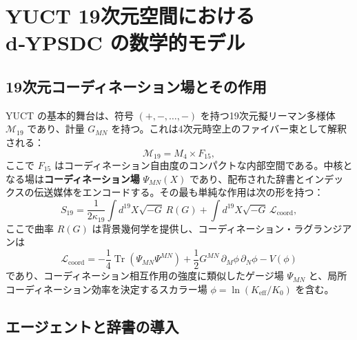 \documentclass[11pt,a4paper]{article}
\DeclareMathOperator{\Tr}{Tr}
\begin{document}
	\section{YUCT 19次元空間における d‑YPSDC の数学的モデル}
	\label{sec:math-model}
	
	\subsection{19次元コーディネーション場とその作用}
	
	YUCT の基本的舞台は、符号 \((+,-,\dots,-)\) を持つ19次元擬リーマン多様体 \(\mathcal{M}_{19}\) であり、計量 \(G_{MN}\) を持つ。これは4次元時空上のファイバー束として解釈される：
	\begin{equation}
		\mathcal{M}_{19} = M_4 \times F_{15},
	\end{equation}
	ここで \(F_{15}\) はコーディネーション自由度のコンパクトな内部空間である。中核となる場は\textbf{コーディネーション場} \(\Psi_{MN}(X)\) であり、配布された辞書とインデックスの伝送媒体をエンコードする。その最も単純な作用は次の形を持つ：
	\begin{equation}
		S_{19} = \frac{1}{2\kappa_{19}} \int d^{19}X \sqrt{-G}\, R(G) + \int d^{19}X \sqrt{-G}\, \mathcal{L}_{\mathrm{coord}},
		\label{eq:S19}
	\end{equation}
	ここで曲率 \(R(G)\) は背景幾何学を提供し、コーディネーション・ラグランジアンは
	\begin{equation}
		\mathcal{L}_{\mathrm{coord}} = -\frac{1}{4} \Tr(\Psi_{MN}\Psi^{MN}) + \frac{1}{2} G^{MN}\,\partial_M \phi\,\partial_N \phi - V(\phi)
		\label{eq:Lcoord}
	\end{equation}
	であり、コーディネーション相互作用の強度に類似したゲージ場 \(\Psi_{MN}\) と、局所コーディネーション効率を決定するスカラー場 \(\phi = \ln(K_{\mathrm{eff}}/K_0)\) を含む。
	
	\subsection{エージェントと辞書の導入}
	
\end{document}
